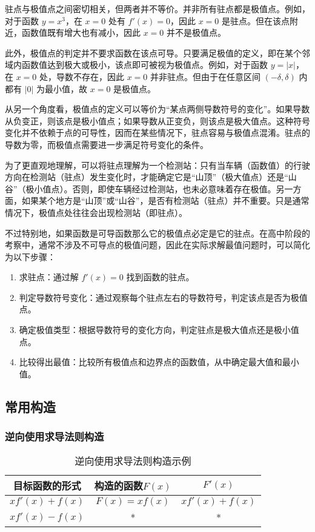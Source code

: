 驻点与极值点之间密切相关，但两者并不等价。并非所有驻点都是极值点。例如，对于函数 $y = x^3$，在 $x = 0$ 处有 $f'(x) = 0$，因此 $x = 0$ 是驻点。但在该点附近，函数值既有增大也有减小，因此 $x = 0$ 并不是极值点。

此外，极值点的判定并不要求函数在该点可导。只要满足极值的定义，即在某个邻域内函数值达到极大或极小，该点即可被视为极值点。例如，对于函数 $y = |x|$，在 $x = 0$ 处，导数不存在，因此 $x = 0$ 并非驻点。但由于在任意区间 $(-\delta, \delta)$ 内都有 $|0|$ 为最小值，故 $x = 0$ 是极值点。

从另一个角度看，极值点的定义可以等价为“某点两侧导数符号的变化”。如果导数从负变正，则该点是极小值点；如果导数从正变负，则该点是极大值点。这种符号变化并不依赖于点的可导性，因而在某些情况下，驻点容易与极值点混淆。驻点的导数为零，而极值点需要进一步满足符号变化的条件。

为了更直观地理解，可以将驻点理解为一个检测站：只有当车辆（函数值）的行驶方向在检测站（驻点）发生变化时，才能确定它是“山顶”（极大值点）还是“山谷”（极小值点）。否则，即使车辆经过检测站，也未必意味着存在极值。另一方面，如果某个地方是“山顶”或“山谷”，是否有检测站（驻点）并不重要。只是通常情况下，极值点处往往会出现检测站（即驻点）。

不过特别地，如果函数是可导函数那么它的极值点必定是它的驻点。在高中阶段的考察中，通常不涉及不可导点的极值问题，因此在实际求解最值问题时，可以简化为以下步骤：

\begin{enumerate}
\item 求驻点：通过解 $f'(x) = 0$ 找到函数的驻点。
\item 判定导数符号变化：通过观察每个驻点左右的导数符号，判定该点是否为极值点。
\item 确定极值类型：根据导数符号的变化方向，判定驻点是极大值点还是极小值点。
\item 比较得出最值：比较所有极值点和边界点的函数值，从中确定最大值和最小值。
\end{enumerate}

\subsection{常用构造}


\subsubsection{逆向使用求导法则构造}

\begin{table}[ht]
\centering
\caption{逆向使用求导法则构造示例}\label{tab_HsDerC1}
\begin{tabular}{|c|c|c|}
\hline
目标函数的形式 &构造的函数$F(x)$& $F'(x)$ \\
\hline

$x f'(x) + f(x)$ & $F(x) = x f(x)$ & $x f'(x) + f(x)$ \\
\hline
$xf'(x) - f(x)$ & * & * \\
\hline
\end{tabular}
\end{table}

